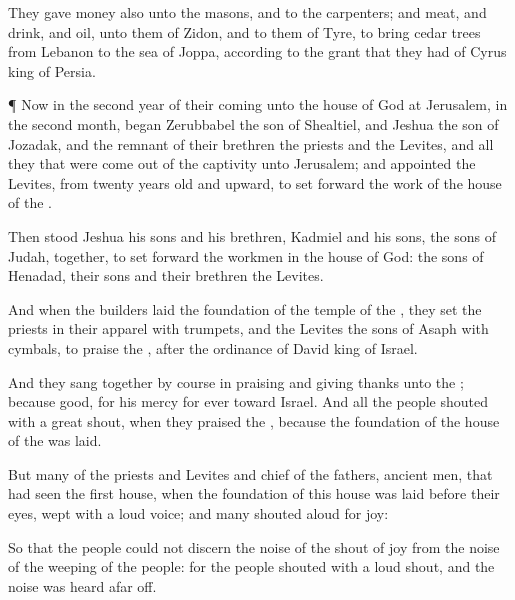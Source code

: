 {They
gave
money also unto the
masons, and to the
carpenters; and
meat, and
drink, and
oil, unto them of
Zidon, and to them of
Tyre, to
bring
cedar
trees from
Lebanon to the
sea of
Joppa, according to the
grant that they had of
Cyrus
king of
Persia.


\par }{\PP {}¶ Now in the
second
year of their
coming unto the
house of
God at
Jerusalem, in the
second
month,
began
Zerubbabel the
son of
Shealtiel, and
Jeshua the
son of
Jozadak, and the
remnant of their
brethren the
priests and the
Levites, and all they that were come
out of the
captivity unto
Jerusalem; and
appointed the
Levites, from
twenty
years
old and
upward, to set
forward the
work of the
house of the
{}.

Then
stood
Jeshua
{} his
sons and his
brethren,
Kadmiel and his
sons, the
sons of
Judah,
together, to set
forward the
workmen in the
house of
God: the
sons of
Henadad,
{} their
sons and their
brethren the
Levites.

And when the
builders laid the
foundation of the
temple of the
{}, they
set the
priests in their
apparel with
trumpets, and the
Levites the
sons of
Asaph with
cymbals, to
praise the
{}, after the
ordinance of
David
king of
Israel.

And they sang together by
course in
praising and giving
thanks unto the
{}; because
{}
good, for his
mercy
{} for
ever toward
Israel. And all the
people
shouted with a
great
shout, when they
praised the
{}, because the
foundation of the
house of the
{} was
laid.

But
many of the
priests and
Levites and
chief of the
fathers,
{} ancient
men, that had
seen the
first
house, when the
foundation of this
house was
laid before their
eyes,
wept with a
loud
voice; and
many
shouted
aloud for
joy:

So that the
people could not
discern the
noise of the
shout of
joy from the
noise of the
weeping of the
people: for the
people
shouted with a
loud
shout, and the
noise was
heard afar
off.




\par }
